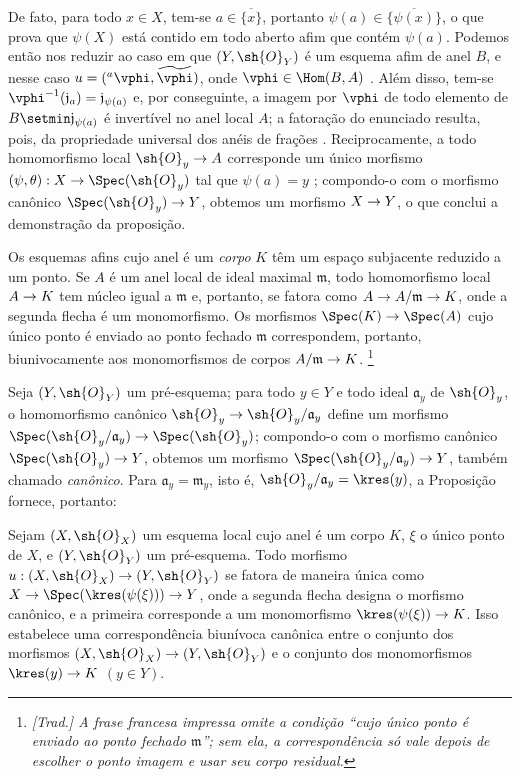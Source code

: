 \documentclass[oneside]{amsart}
\makeatletter
\newcommand{\ega@arrow}[2]{\mathchoice{#1}{#2}{#2}{#2}}
\renewcommand{\to}{\ega@arrow{\longrightarrow}{\rightarrow}}
\newcommand{\oldpage}[2][]{{\marginnote{\normalfont\textbf{#1}~|~#2}}\ignorespaces}
\let\EGAOriginalLabel\label
\renewcommand{\label}[1]{\phantomsection\EGAOriginalLabel{#1}}
\makeatother
\begin{document}
De fato, para todo $x\in X$, tem-se $a\in\overline{\{x\}}$, portanto
$\psi(a)\in\overline{\{\psi(x)\}}$, o que prova que $\psi(X)$ está
contido em todo aberto afim que contém $\psi(a)$. Podemos então nos
reduzir ao caso em que $(Y,\sh{O}_Y)$ é um esquema afim de anel $B$, e
nesse caso $u=({}^a\vphi,\widetilde{\vphi})$, onde
$\vphi\in\Hom(B,A)$ . Além disso, tem-se
$\vphi^{-1}(\mathfrak{j}_a)=\mathfrak{j}_{\psi(a)}$ e, por conseguinte,
a imagem por $\vphi$ de todo elemento de
$B\setmin\mathfrak{j}_{\psi(a)}$ é invertível no anel local $A$; a
fatoração do enunciado resulta, pois, da propriedade universal dos
anéis de frações . Reciprocamente, a todo homomorfismo
local $\sh{O}_y\to A$ corresponde um único morfismo
$(\psi,\theta):X\to\Spec(\sh{O}_y)$ tal que $\psi(a)=y$
; compondo-o com o morfismo canônico
$\Spec(\sh{O}_y)\to Y$, obtemos um morfismo $X\to Y$, o que conclui a
demonstração da proposição.

\begin{env}[2.4.5]
\label{I.2.4.5}
Os esquemas afins cujo anel é um \emph{corpo} $K$ têm um espaço
subjacente reduzido a um ponto. Se $A$ é um anel local de ideal maximal
$\mathfrak{m}$, todo homomorfismo local $A\to K$ tem núcleo igual a
$\mathfrak{m}$ e, portanto, se fatora como
$A\to A/\mathfrak{m}\to K$, onde a segunda flecha é um monomorfismo. Os
morfismos $\Spec(K)\to\Spec(A)$ cujo único ponto é enviado ao ponto
fechado $\mathfrak{m}$ correspondem, portanto, biunivocamente aos
monomorfismos de corpos $A/\mathfrak{m}\to K$.
\footnote{\emph{[Trad.] A frase francesa impressa omite a condição
``cujo único ponto é enviado ao ponto fechado $\mathfrak{m}$''; sem
ela, a correspondência só vale depois de escolher o ponto imagem e usar
seu corpo residual.}}
\end{env}

Seja $(Y,\sh{O}_Y)$ um pré-esquema; para todo $y\in Y$ e todo ideal
$\mathfrak{a}_y$ de $\sh{O}_y$, o homomorfismo canônico
$\sh{O}_y\to\sh{O}_y/\mathfrak{a}_y$ define um morfismo
$\Spec(\sh{O}_y/\mathfrak{a}_y)\to\Spec(\sh{O}_y)$; compondo-o com o
morfismo canônico $\Spec(\sh{O}_y)\to Y$, obtemos um morfismo
$\Spec(\sh{O}_y/\mathfrak{a}_y)\to Y$, também chamado
\emph{canônico}. Para $\mathfrak{a}_y=\mathfrak{m}_y$, isto é,
$\sh{O}_y/\mathfrak{a}_y=\kres(y)$, a Proposição~ fornece,
portanto:

\begin{corollary}[2.4.6]
\label{I.2.4.6}
\oldpage[I]{103}
Sejam $(X,\sh{O}_X)$ um esquema local cujo anel é um corpo $K$, $\xi$ o
único ponto de $X$, e $(Y,\sh{O}_Y)$ um pré-esquema. Todo morfismo
$u:(X,\sh{O}_X)\to(Y,\sh{O}_Y)$ se fatora de maneira única como
$X\to\Spec(\kres(\psi(\xi)))\to Y$, onde a segunda flecha designa o
morfismo canônico, e a primeira corresponde a um monomorfismo
$\kres(\psi(\xi))\to K$. Isso estabelece uma correspondência biunívoca
canônica entre o conjunto dos morfismos
$(X,\sh{O}_X)\to(Y,\sh{O}_Y)$ e o conjunto dos monomorfismos
$\kres(y)\to K$ $(y\in Y)$.
\end{corollary}
\end{document}
